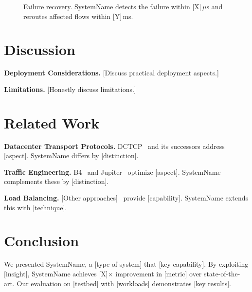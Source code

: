 \documentclass[letterpaper,twocolumn,10pt]{article}
\newcommand{\system}{SystemName\xspace}
\newcommand{\para}[1]{\smallskip\noindent\textbf{#1.}}
\newcommand{\us}{\,$\mu$s\xspace}
\newcommand{\ms}{\,ms\xspace}
\begin{document}
\begin{figure}[t]
  \centering
  \caption{Failure recovery. \system detects the failure within [X]\us
    and reroutes affected flows within [Y]\ms.}
  \label{fig:failure}
\end{figure}

\section{Discussion}
\label{sec:discussion}

\para{Deployment Considerations}
[Discuss practical deployment aspects.]

\para{Limitations}
[Honestly discuss limitations.]

\section{Related Work}
\label{sec:related}


\para{Datacenter Transport Protocols}
DCTCP~\cite{alizadeh2010dctcp} and its successors address [aspect].
\system differs by [distinction].

\para{Traffic Engineering}
B4~\cite{jain2013b4} and Jupiter~\cite{singh2015jupiter} optimize
[aspect]. \system complements these by [distinction].

\para{Load Balancing}
[Other approaches]~\cite{hopps2000rfc, patel2013ananta} provide
[capability]. \system extends this with [technique].

\section{Conclusion}
\label{sec:conclusion}

We presented \system, a [type of system] that [key capability].
By exploiting [insight], \system achieves [X]$\times$ improvement
in [metric] over state-of-the-art. Our evaluation on [testbed]
with [workloads] demonstrates [key results].

{\footnotesize 
}
\end{document}
